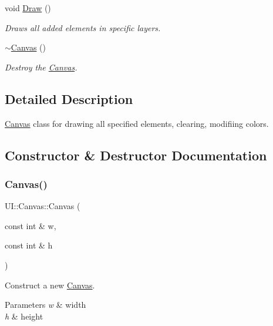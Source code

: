 \begin{DoxyCompactItemize}
\mbox{\label{classUI_1_1Canvas_a9afb42f7b8f5e99deb3b36c8d1a0d4c9}} 
void \hyperlink{classUI_1_1Canvas_a9afb42f7b8f5e99deb3b36c8d1a0d4c9}{Draw} ()
\begin{DoxyCompactList}\small\item\em Draws all added elements in specific layers. \end{DoxyCompactList}\item 
\mbox{\label{classUI_1_1Canvas_a7adb85a7c20301fb8cd5d1aa64ef8a56}} 
\hyperlink{classUI_1_1Canvas_a7adb85a7c20301fb8cd5d1aa64ef8a56}{$\sim$\+Canvas} ()
\begin{DoxyCompactList}\small\item\em Destroy the \hyperlink{classUI_1_1Canvas}{Canvas}. \end{DoxyCompactList}\end{DoxyCompactItemize}


\subsection{Detailed Description}
\hyperlink{classUI_1_1Canvas}{Canvas} class for drawing all specified elements, clearing, modifiing colors. 

\subsection{Constructor \& Destructor Documentation}
\mbox{\label{classUI_1_1Canvas_a4defdb530bdaecfa571244727688811b}} 
\subsubsection{\texorpdfstring{Canvas()}{Canvas()}}
{\footnotesize\ttfamily U\+I\+::\+Canvas\+::\+Canvas (\begin{DoxyParamCaption}\item[{const int \&}]{w,  }\item[{const int \&}]{h }\end{DoxyParamCaption})}



Construct a new \hyperlink{classUI_1_1Canvas}{Canvas}. 


\begin{DoxyParams}{Parameters}
{\em w} & width \\
\hline
{\em h} & height \\
\hline
\end{DoxyParams}


